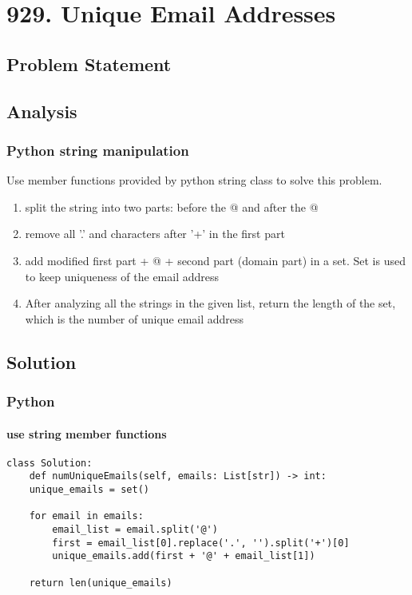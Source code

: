 \documentclass[12pt]{article}
\begin{document}
\section{929. Unique Email Addresses}
\label{sec:org9f8bd2f}
\subsection{Problem Statement}
\label{sec:org927b7fd}
\subsection{Analysis}
\label{sec:orga20cb9e}
\subsubsection{Python string manipulation}
\label{sec:org9a2c325}
Use member functions provided by python string class to solve this problem.
\begin{enumerate}
\item split the string into two parts: before the @ and after the @
\item remove all '.'  and characters after '+' in the first part
\item add modified first part + @ + second part (domain part) in a set. Set is used to keep uniqueness of the email address
\item After analyzing all the strings in the given list, return the length of the set, which is the number of unique email address
\end{enumerate}
\subsection{Solution}
\label{sec:org047bd94}
\subsubsection{Python}
\label{sec:orge18c119}
\paragraph{use string member functions}
\label{sec:org1aa2a85}
\begin{verbatim}
class Solution:
    def numUniqueEmails(self, emails: List[str]) -> int:
	unique_emails = set()

	for email in emails:
	    email_list = email.split('@')
	    first = email_list[0].replace('.', '').split('+')[0]
	    unique_emails.add(first + '@' + email_list[1])

	return len(unique_emails)
\end{verbatim}
\end{document}
